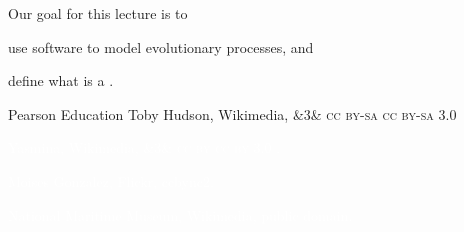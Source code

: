 \documentclass[t]{beamer}
\newcommand{\ccby}[1]{%
	\ifx&#1&
	{\textsc{cc by}}%
\else
	{\textsc{cc by #1.0}}
\fi}
\newcommand{\ccbysa}[1]{%
	\ifx&#1&
	{\textsc{cc by-sa}}%
\else
	{\textsc{cc by-sa #1.0}} 
\fi}
\begin{document}
\begin{frame}{Our goal for this lecture is to }
	
	\hangpara use software to model evolutionary processes, and
	
	\hangpara define what is a .
	
\end{frame}
%
{
\begin{frame}[b,plain]{}
\tiny \textcopyright Pearson Education \hfill Toby Hudson, Wikimedia, \ccbysa{3}
\end{frame}
}
{
\begin{frame}[b]{}
\hfill \textcolor{white}{\tiny Yasmina, Wikimedia, \ccby{3}.}
\end{frame}
}

{
\begin{frame}[b]{}
\hfill \textcolor{white}{\tiny Moises Gonzalez, Flickr, ccbync{2}.}
\end{frame}
}

{
\begin{frame}[b]{}
\hfill \textcolor{white}{\tiny National Maritime Museum, Wikimedia, public domain.}
\end{frame}
}
\end{document}
